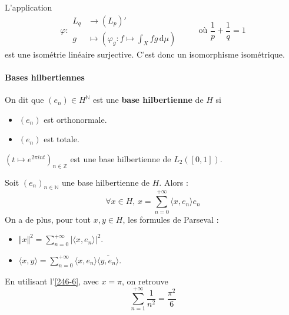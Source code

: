 
	\begin{theorem}
		L'application
		\[
		\varphi :
		\begin{array}{ll}
			L_q &\rightarrow (L_p)' \\
			g &\mapsto \left( \varphi_g : f \mapsto \int_X f g \, \mathrm{d}\mu \right)
		\end{array}
		\qquad \text{ où } \frac{1}{p} + \frac{1}{q} = 1
		\]
		est une isométrie linéaire surjective. C'est donc un isomorphisme isométrique.
	\end{theorem}

	\paragraph{Bases hilbertiennes}


	\begin{definition}
		On dit que $(e_n) \in H^{\mathbb{N}}$ est une \textbf{base hilbertienne} de $H$ si
		\begin{itemize}
			\item $(e_n)$ est orthonormale.
			\item $(e_n)$ est totale.
		\end{itemize}
	\end{definition}

	\begin{example}
		$(t \mapsto e^{2\pi int})_{n \in \mathbb{Z}}$ est une base hilbertienne de $L_2([0,1])$.
	\end{example}

	\begin{theorem}
		Soit $(e_n)_{n \in \mathbb{N}}$ une base hilbertienne de $H$. Alors :
		\[ \forall x \in H, \, x = \sum_{n=0}^{+\infty} \langle x, e_n \rangle e_n \]
		On a de plus, pour tout $x, y \in H$, les formules de Parseval :
		\begin{itemize}
			\item $\Vert x \Vert^2 = \sum_{n=0}^{+\infty} \vert \langle x, e_n \rangle \vert^2$.
			\item $\langle x, y \rangle = \sum_{n=0}^{+\infty} \langle x, e_n \rangle \overline{\langle y, e_n \rangle}$.
		\end{itemize}
	\end{theorem}


  \begin{application}
    En utilisant l'\cref{246-6}, avec $x = \pi$, on retrouve
    \[ \sum_{n = 1}^{+\infty} \frac{1}{n^2} = \frac{\pi^2}{6} \]
  \end{application}

